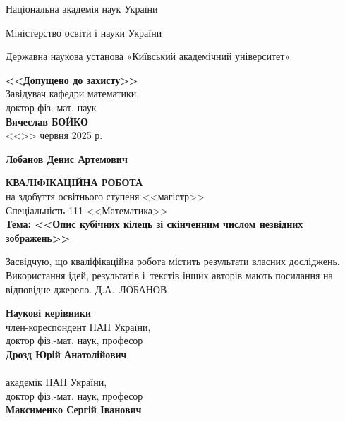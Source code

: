 \documentclass{thesis}
\begin{document}
\allowdisplaybreaks

\large

\setcounter{page}{1}
\thispagestyle{empty}
\centerline{Національна академія наук України}
\centerline{Міністерство освіти і науки України}
\centerline{Державна наукова установа «Київський академічний університет»}

\vspace{10mm}

\begin{flushright}
\begin{minipage}{100mm}
\begin{center}\large {\bf <<Допущено до захисту>>}\\
Завідувач кафедри математики,\\
доктор фіз.-мат. наук\\
{\bf Вячеслав БОЙКО}\\
<<\underline{\hspace{8mm}}>> червня 2025 р.
\end{center}
\end{minipage}
\end{flushright}

\vspace{10mm}

\centerline{\Large \bf Лобанов Денис Артемович}

\begin{center}
{\bf КВАЛІФІКАЦІЙНА РОБОТА}\\
на здобуття освітнього ступеня <<магістр>>\\
Спеціальність 111 <<Математика>>\\[4mm]
{\Large \bf Тема: <<Опис кубічних кілець зі скінченним числом незвідних зображень>>}
\end{center}


\vspace{5mm}

\noindent
{Засвідчую, що кваліфікаційна робота містить результати власних досліджень. Використання ідей, результатів і~текстів інших авторів мають посилання на відповідне джерело.
\underline{\hspace{18mm}} Д.А.~ЛОБАНОВ\par}

\vspace{5mm}

\begin{flushright}
\begin{minipage}{90mm}
\large {\bf Наукові керівники}\\
член-кореспондент НАН України, \\ доктор фіз.-мат. наук, професор\\
{\bf Дрозд Юрій Анатолійович}\\
\underline{\hspace{48mm}}\\
академік НАН України, \\ доктор фіз.-мат. наук, професор\\
{\bf Максименко Сергій Іванович}\\
\underline{\hspace{48mm}}

\end{minipage}
\end{flushright}
\end{document}

